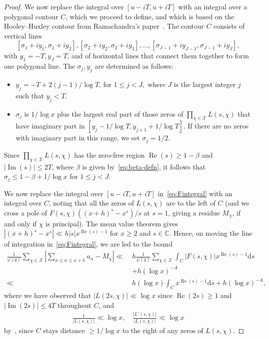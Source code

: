 \documentclass[11pt,letterpaper]{amsart}
\renewcommand{\leq}{\leqslant}
\renewcommand{\geq}{\geqslant}
\renewcommand{\d}{\mathrm{d}}
\theoremstyle{definition}
\numberwithin{equation}{section}
\renewcommand{\Im}{\im}
\DeclareMathOperator{\real}{Re}
\DeclareMathOperator{\im}{Im}
\newcommand{\0}{\mathbf{0}}
\begin{document}
\begin{proof}
We now replace the integral over $[u-iT,u+iT]$ with an integral over a polygonal contour $C$, which we proceed to define, and which is based on the Hooley--Huxley contour from Ramachandra’s paper~\cite{rama}.
The contour $C$ consists of vertical lines 
$$
[\sigma_1+iy_1,\sigma_1+iy_2], [\sigma_2+iy_2, \sigma_2+iy_3], \dots ,[\sigma_{J-1}+iy_{J-1},\sigma_{J-1}+iy_J],
$$ 
with $y_1=-T, y_J=T$, and of horizontal lines that connect them together to form one polygonal line. 
The $\sigma_j, y_j$ are determined as follows:
\begin{itemize}
\item[(i)]  $y_j=-T+2(j-1)/\log T$, for $1\leq  j<J,$ where $J$ is the largest integer $j$ such that $y_{j}<T$.
\item[(ii)]  $\sigma_j$ is $1/\log x$ plus the largest real part of those zeros of $\prod_{\chi\in \mathcal{X}}L(s,\chi)$ that have imaginary part in $[y_j-1/\log T,y_{j+1}+1/\log T]$. If there are no zeros with imaginary part in this range, we  set $\sigma_j=1/2$.
\end{itemize}
Since $\prod_{\chi\in \mathcal{X}}L(s,\chi)$ has the zero-free region 
$\real(s)\geq 1-\beta$ and $|\im(s)|\leq 2T$,
where $\beta$ is given by~\eqref{eq:beta-defn},
it follows  that  $\sigma_j\leq 1-\beta+1/\log x$ for $1\leq j<J$.

We now replace the integral over $[u-iT,u+iT]$ in~\eqref{eq:Fintegral} with an integral over $C$, noting that all the zeros of $L(s,\chi)$ are to the left of $C$ (and we cross a pole of $F(s,\chi)((x+h)^s-x^s)/s$ at $s=1$, giving a residue $M_{\chi}$, if and only if $\chi$ is principal). 
The mean value theorem gives
$|(x+h)^s-x^s|\ll h|s| x^{\real(s)-1}$ for $x\geq 2$ and $s\in \mathbb{C}$. 
Hence, on moving the line of integration in~\eqref{eq:Fintegral}, we are led to the bound 
\begin{equation}
\begin{split}
\label{eq:integrate}
\frac{1}{\varphi(q)}\sum_{\chi \in \mathcal{X}}\left|\sum_{x\leq n\leq x+h}
a_n-M_{\chi}\right|
\ll~& h \frac{1}{\varphi(q)}\sum_{\chi \in \mathcal{X}} \int_C |F(s,\chi)|x^{\real(s)-1} \d s\\
 &+h(\log x)^{-A}\\
\ll~&  h (\log x) \int_C x^{\real(s)-1} \d s
+h(\log x)^{-A},
\end{split}
\end{equation}
where we have observed that $|L(2s,\chi)|\ll \log x$ 
since $\real(2s)\geq 1$ and $|\Im(2s)|\leq 4T$ throughout $C$, and
\begin{align*}
\frac{1}{|L(s,\chi)|}\ll \log x,\quad \frac{|L'(s,\chi)|}{|L(s,\chi)|}\ll \log x    
\end{align*}
by~\cite[Thm.~11.4]{montgomery-vaughan}, since $C$ stays distance $\geq 1/\log x$ to the right of any zeros of $L(s,\chi)$.


\end{proof}
\end{document}

